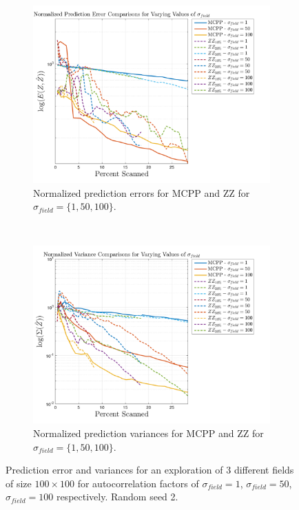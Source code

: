 \begin{figure}[htb!]
    \centering
    \begin{subfigure}[t]{0.75\textwidth}
        \centering
        \includegraphics[width=\linewidth]{figures/results/errors_30p_100x100_sf_all_seed_2_app_0.png}
        \captionsetup{skip=0.20\baselineskip,size=footnotesize}
        \caption{Normalized prediction errors for MCPP and ZZ for $\sigma_{field} = \{1, 50, 100\}$.}
    \end{subfigure}%
    \\
    \begin{subfigure}[t]{0.75\textwidth}
        \centering
        \includegraphics[width=\linewidth]{figures/results/variances_30p_100x100_sf_all_seed_2_app_0.png}
        \captionsetup{skip=0.20\baselineskip,size=footnotesize}
        \caption{Normalized prediction variances for MCPP and ZZ for $\sigma_{field} = \{1, 50, 100\}$.}
    \end{subfigure}%
    \ssp
    \captionsetup{skip=0.20\baselineskip}
    \caption{Prediction error and variances for an exploration of $3$ different fields of size $100 \times 100$ for autocorrelation factors of $\sigma_{field} = 1$, $\sigma_{field} = 50$, $\sigma_{field} = 100$ respectively. Random seed 2.}
    \label{fig:multaccomp_s2}
\end{figure}
